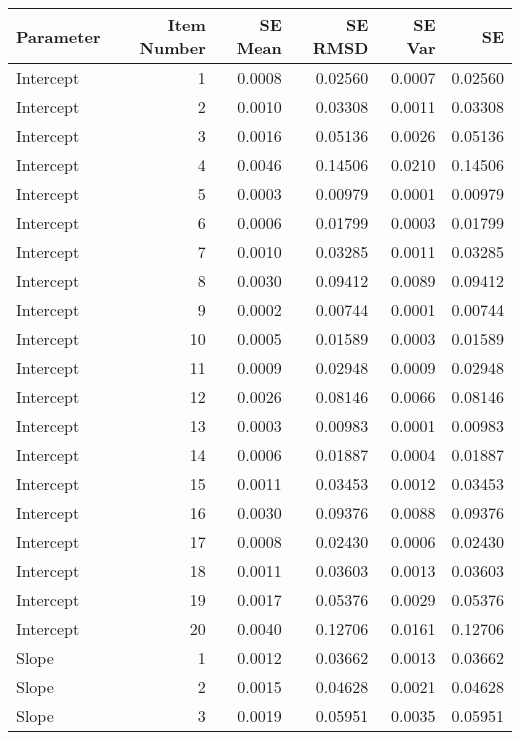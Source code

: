 \begin{table}[H]
\centering
\begin{tabular}{lrrrrr}
  \hline
Parameter & Item Number & SE Mean & SE RMSD & SE Var & SE \\ 
  \hline
Intercept &   1 & 0.0008 & 0.02560 & 0.0007 & 0.02560 \\ 
  Intercept &   2 & 0.0010 & 0.03308 & 0.0011 & 0.03308 \\ 
  Intercept &   3 & 0.0016 & 0.05136 & 0.0026 & 0.05136 \\ 
  Intercept &   4 & 0.0046 & 0.14506 & 0.0210 & 0.14506 \\ 
  Intercept &   5 & 0.0003 & 0.00979 & 0.0001 & 0.00979 \\ 
  Intercept &   6 & 0.0006 & 0.01799 & 0.0003 & 0.01799 \\ 
  Intercept &   7 & 0.0010 & 0.03285 & 0.0011 & 0.03285 \\ 
  Intercept &   8 & 0.0030 & 0.09412 & 0.0089 & 0.09412 \\ 
  Intercept &   9 & 0.0002 & 0.00744 & 0.0001 & 0.00744 \\ 
  Intercept &  10 & 0.0005 & 0.01589 & 0.0003 & 0.01589 \\ 
  Intercept &  11 & 0.0009 & 0.02948 & 0.0009 & 0.02948 \\ 
  Intercept &  12 & 0.0026 & 0.08146 & 0.0066 & 0.08146 \\ 
  Intercept &  13 & 0.0003 & 0.00983 & 0.0001 & 0.00983 \\ 
  Intercept &  14 & 0.0006 & 0.01887 & 0.0004 & 0.01887 \\ 
  Intercept &  15 & 0.0011 & 0.03453 & 0.0012 & 0.03453 \\ 
  Intercept &  16 & 0.0030 & 0.09376 & 0.0088 & 0.09376 \\ 
  Intercept &  17 & 0.0008 & 0.02430 & 0.0006 & 0.02430 \\ 
  Intercept &  18 & 0.0011 & 0.03603 & 0.0013 & 0.03603 \\ 
  Intercept &  19 & 0.0017 & 0.05376 & 0.0029 & 0.05376 \\ 
  Intercept &  20 & 0.0040 & 0.12706 & 0.0161 & 0.12706 \\ 
  Slope &   1 & 0.0012 & 0.03662 & 0.0013 & 0.03662 \\ 
  Slope &   2 & 0.0015 & 0.04628 & 0.0021 & 0.04628 \\ 
  Slope &   3 & 0.0019 & 0.05951 & 0.0035 & 0.05951 \\ 

\end{tabular}
\end{table}
